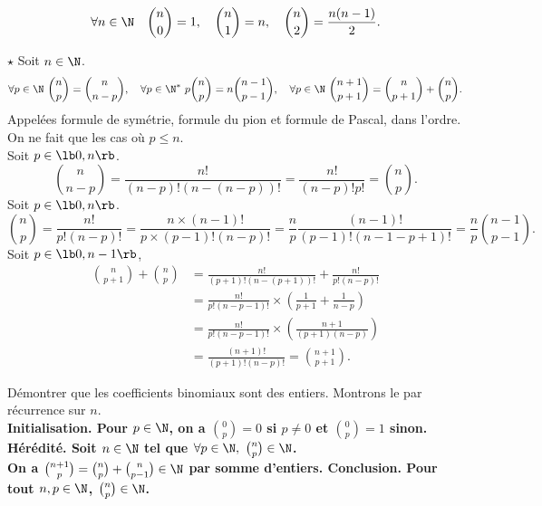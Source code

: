 \documentclass[11pt]{article}
\begin{document}
\begin{ex}{}{}
    \begin{equation*}
        \forall n\in\N\quad\binom{n}{0}=1,\quad\binom{n}{1}=n,\quad\binom{n}{2}=\frac{n(n-1)}{2}.
    \end{equation*}
\end{ex}

\begin{prop}{$\star$}{}
    Soit $n\in\N$.
    \begin{equation*}
        \forall p\in\N~\binom{n}{p}=\binom{n}{n-p},\quad\forall p\in\N^*~p\binom{n}{p}=n\binom{n-1}{p-1},\quad\forall p\in\N~\binom{n+1}{p+1}=\binom{n}{p+1}+\binom{n}{p}.
    \end{equation*}
    Appelées formule de symétrie, formule du pion et formule de Pascal, dans l'ordre.
    \tcblower
    On ne fait que les cas où $p\leq n$.\\
     Soit $p\in\lb0,n\rb$.
    \begin{equation*}
        \binom{n}{n-p}=\frac{n!}{(n-p)!(n-(n-p))!}=\frac{n!}{(n-p)!p!}=\binom{n}{p}.
    \end{equation*}
     Soit $p\in\lb0,n\rb$.
    \begin{equation*}
        \binom{n}{p}=\frac{n!}{p!(n-p)!}=\frac{n\times(n-1)!}{p\times(p-1)!(n-p)!}=\frac{n}{p}\frac{(n-1)!}{(p-1)!(n-1-p+1)!}=\frac{n}{p}\binom{n-1}{p-1}.
    \end{equation*}
     Soit $p\in\lb0,n-1\rb$,
    \begin{align*}
        \binom{n}{p+1}+\binom{n}{p}&=\frac{n!}{(p+1)!(n-(p+1))!}+\frac{n!}{p!(n-p)!}\\
        &=\frac{n!}{p!(n-p-1)!}\times\left( \frac{1}{p+1} + \frac{1}{n-p} \right)\\
        &=\frac{n!}{p!(n-p-1)!}\times\left( \frac{n+1}{(p+1)(n-p)} \right)\\
        &=\frac{(n+1)!}{(p+1)!(n-p)!}=\binom{n+1}{p+1}.
    \end{align*}
\end{prop}

\begin{ex}{}{}
    Démontrer que les coefficients binomiaux sont des entiers.
    \tcblower
    Montrons le par récurrence sur $n$.\\
    \bf{Initialisation.} Pour $p\in\N$, on a $\binom{0}{p}=0$ si $p\neq 0$ et $\binom{0}{p}=1$ sinon.\\
    \bf{Hérédité.} Soit $n\in\N$ tel que $\forall p \in \N, ~ \binom{n}{p}\in\N$.\\
    On a $\binom{n+1}{p}=\binom{n}{p}+\binom{n}{p-1}\in\N$ par somme d'entiers.
    \bf{Conclusion.} Pour tout $n,p\in\N$, $\binom{n}{p}\in\N$.
\end{ex}
\end{document}
